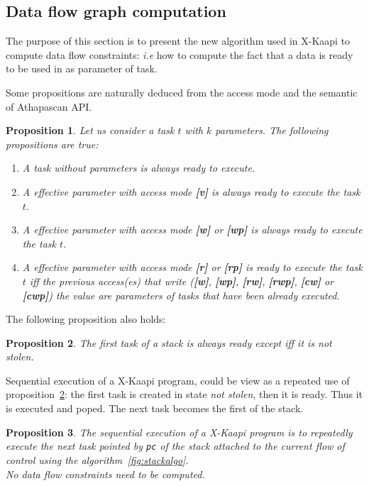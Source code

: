 \documentclass[12pt]{report}
\newcommand{\kaapi}{\textsc{X}-Kaapi\xspace}
\newtheorem{proposition}{Proposition}
\begin{document}
\newpage
\subsection{Data flow graph computation}
The purpose of this section is to present the new algorithm used in \kaapi to compute data flow constraints: \textit{i.e} how to compute the fact that a data is ready to be used in as parameter of task.

Some propositions are naturally deduced from the access mode and the semantic of Athapascan API.
\begin{proposition}
Let us consider a task $t$ with $k$ parameters. The following propositions are true: 
\begin{enumerate} \label{prop1}
\item \label{p1a} A task without parameters is always ready to execute.
\item \label{p1b} A effective parameter with access mode \textbf{[v]} is always ready to execute the task $t$.
\item \label{p1c} A effective parameter with access mode \textbf{[w]} or \textbf{[wp]} is always ready to execute the task $t$.
\item \label{p1d} A effective parameter with access mode \textbf{[r]} or \textbf{[rp]} is ready to execute the task $t$ iff the previous access(es) 
that write (\textbf{[w]}, \textbf{[wp]}, \textbf{[rw]}, \textbf{[rwp]}, \textbf{[cw]} or \textbf{[cwp]}) the value are parameters of tasks that have been already executed. 
\end{enumerate}
\end{proposition}

The following proposition also holds:
\begin{proposition}\label{prop2} 
The first task of a stack is always ready except iff it is not stolen.
\end{proposition}

Sequential execution of a \kaapi program, could be view as a repeated use of proposition~\ref{prop2}: the first task is created in state \textit{not stolen}, then it is ready. Thus it is executed and poped. The next task becomes the first of the stack.
\begin{proposition}
The sequential execution of a \kaapi program is to repeatedly execute the next task pointed by \texttt{pc} of the stack attached to the current flow of control using the algorithm~\ref{fig:stackalgo}.\\
No data flow constraints need to be computed.
\end{proposition}
\end{document}

